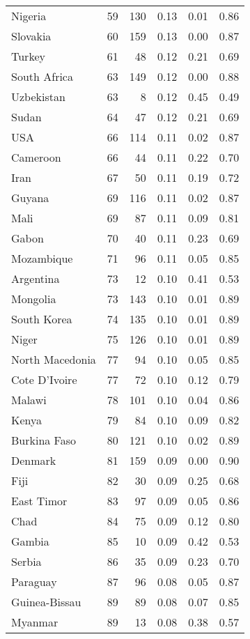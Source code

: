 \begin{longtable}[t]{lrrrrr}
Nigeria & 59 & 130 & 0.13 & 0.01 & 0.86\\
Slovakia & 60 & 159 & 0.13 & 0.00 & 0.87\\
\addlinespace
Turkey & 61 & 48 & 0.12 & 0.21 & 0.69\\
South Africa & 63 & 149 & 0.12 & 0.00 & 0.88\\
Uzbekistan & 63 & 8 & 0.12 & 0.45 & 0.49\\
Sudan & 64 & 47 & 0.12 & 0.21 & 0.69\\
USA & 66 & 114 & 0.11 & 0.02 & 0.87\\
\addlinespace
Cameroon & 66 & 44 & 0.11 & 0.22 & 0.70\\
Iran & 67 & 50 & 0.11 & 0.19 & 0.72\\
Guyana & 69 & 116 & 0.11 & 0.02 & 0.87\\
Mali & 69 & 87 & 0.11 & 0.09 & 0.81\\
Gabon & 70 & 40 & 0.11 & 0.23 & 0.69\\
\addlinespace
Mozambique & 71 & 96 & 0.11 & 0.05 & 0.85\\
Argentina & 73 & 12 & 0.10 & 0.41 & 0.53\\
Mongolia & 73 & 143 & 0.10 & 0.01 & 0.89\\
South Korea & 74 & 135 & 0.10 & 0.01 & 0.89\\
Niger & 75 & 126 & 0.10 & 0.01 & 0.89\\
\addlinespace
North Macedonia & 77 & 94 & 0.10 & 0.05 & 0.85\\
Cote D'Ivoire & 77 & 72 & 0.10 & 0.12 & 0.79\\
Malawi & 78 & 101 & 0.10 & 0.04 & 0.86\\
Kenya & 79 & 84 & 0.10 & 0.09 & 0.82\\
Burkina Faso & 80 & 121 & 0.10 & 0.02 & 0.89\\
\addlinespace
Denmark & 81 & 159 & 0.09 & 0.00 & 0.90\\
Fiji & 82 & 30 & 0.09 & 0.25 & 0.68\\
East Timor & 83 & 97 & 0.09 & 0.05 & 0.86\\
Chad & 84 & 75 & 0.09 & 0.12 & 0.80\\
Gambia & 85 & 10 & 0.09 & 0.42 & 0.53\\
\addlinespace
Serbia & 86 & 35 & 0.09 & 0.23 & 0.70\\
Paraguay & 87 & 96 & 0.08 & 0.05 & 0.87\\
Guinea-Bissau & 89 & 89 & 0.08 & 0.07 & 0.85\\
Myanmar & 89 & 13 & 0.08 & 0.38 & 0.57\\

\end{longtable}
